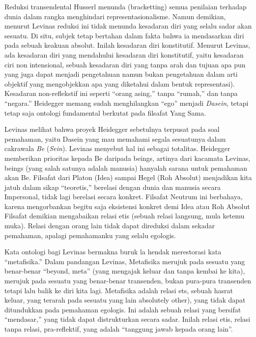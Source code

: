 \documentclass[11pt,twoside,a5paper,openany]{memoir}
\begin{document}
Reduksi transendental Husserl menunda (bracketting) semua penilaian
terhadap dunia dalam rangka menghindari representasionalisme. Namun
demikian, menurut Levinas reduksi ini tidak menunda kesadaran diri yang
selalu sadar akan sesuatu. Di situ, subjek tetap bertahan dalam fakta
bahwa ia mendasarkan diri pada sebuah keakuan absolut. Inilah kesadaran
diri konstitutif. Menurut Levinas, ada kesadaran diri yang mendahului
kesadaran diri konstitutif, yaitu kesadaran ciri non intensional, sebuah
kesadaran diri yang tanpa arah dan tujuan apa pun yang juga dapat
menjadi pengetahuan namun bukan pengetahuan dalam arti objektif yang
mengobjekkan apa yang diketahui dalam bentuk representasi). Kesadaran
non-reflekstif ini seperti ``orang asing,'' tanpa ``rumah,'' dan tanpa
``negara.'' Heidegger memang sudah menghilangkan ``ego'' menjadi
\emph{Dasein}, tetapi tetap saja ontologi fundamental berkutat pada
filsafat Yang Sama.

Levinas melihat bahwa proyek Heidegger sebetulnya terpusat pada soal
pemahaman, yaitu Dasein yang mau memahami segala sesuatunya dalam
cakrawala \emph{Be} (\emph{Sein}). Levinas menyebut hal ini sebagai
totalitas. Heidegger memberikan prioritas kepada Be daripada beings,
artinya dari kacamata Levinas, beings (yang salah satunya adalah
manusia) hanyalah sarana untuk pemahaman akan Be. Filsafat dari Platon
(Idea) sampai Hegel (Roh Absolut) menjadikan kita jatuh dalam sikap
``teoretis,'' berelasi dengan dunia dan manusia secara Impersonal, tidak
lagi berelasi secara konkret. Filsafat Neutrum ini berbahaya, karena
mengorbankan begitu saja eksistensi konkret demi Idea atau Roh Absolut
Filsafat demikian mengabaikan relasi etis (sebuah relasi langsung, mula
ketemu muka). Relasi dengan orang lain tidak dapat direduksi dalam
sekadar pemahaman, apalagi pemahamanku yang selalu egologis.

Kata ontologi bagi Levinas bermakna buruk la hendak merestorasi kata
``metafisika.'' Dalam pandangan Levinas, Metafisika merujuk pada sesuatu
yang benar-benar ``beyond, meta'' (yang mengajak keluar dan tanpa kembai
ke kita), merujuk pada sesuatu yang benar-benar transenden, bukan
pura-pura transenden tetapi lalu balik ke diri kita lagi. Metafisika
adalah relasi ets, sebuah hasrat keluar, yang terarah pada sesuatu yang
lain absolutely other), yang tidak dapat ditundukkan pada pemahaman
egologis. Ini adalah sebuah relasi yang bersifat ``mendasar,'' yang
tidak dapat distrukturkan secara sadar. Inilah relasi etis, relasi tanpa
relasi, pra-reflektif, yang adalah ``tanggung jawab kepada orang lain''.
\end{document}

